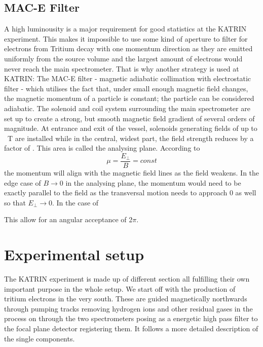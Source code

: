      \subsection{MAC-E Filter}
      \label{ch:The KATRIN experiment:sec:MAC-E}
      A high luminousity is a major requirement for good statistics at the KATRIN experiment. This makes it impossible to use some kind of aperture to filter for electrons from Tritium decay with one momentum direction as they are emitted uniformly from the source volume and the largest amount of electrons would never reach the main spectrometer. That is why another strategy is used at KATRIN: The MAC-E filter - magnetic adiabatic collimation with electrostatic filter - which utilises the fact that, under small enough magnetic field changes, the magnetic momentum of a particle is constant; the particle can be considered adiabatic. The solenoid and coil system surrounding the main spectrometer are set up to create a strong, but smooth magnetic field gradient of several orders of magnitude. At entrance and exit of the vessel, solenoids generating fields of up to \SI{}{\tesla} are installed while in the central, widest part, the field strength reduces by a factor of . This area is called the analysing plane. According to
      \begin{equation}
      	\mu = \frac{E_{\bot}}{B} = const
      \end{equation}
      the momentum will align with the magnetic field lines as the field weakens. In the edge case of $B\rightarrow 0$ in the analysing plane, the momentum would need to be exactly parallel to the field as the transversal motion needs to approach 0 as well so that $E_\bot\rightarrow 0$. In the case of 

       This allow for an angular acceptance of 2$\pi$.
      \section{Experimental setup}
      \label{ch:The KATRIN experiment:sec:Experimental setup}
      The KATRIN experiment is made up of different section all fulfilling their own important purpose in the whole setup. We start off with the production of tritium electrons in the very south. These are guided magnetically northwards through pumping tracks removing hydrogen ions and other residual gases in the process on through the two spectrometers posing as a energetic high pass filter to the focal plane detector registering them. It follows a more detailed description of the single components.
      
